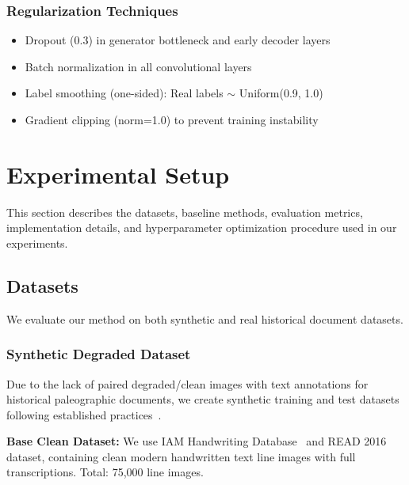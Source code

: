 \documentclass[journal]{IEEEtran}
\begin{document}
\subsubsection{Regularization Techniques}

\begin{itemize}
    \item Dropout (0.3) in generator bottleneck and early decoder layers
    \item Batch normalization in all convolutional layers
    \item Label smoothing (one-sided): Real labels $\sim$ Uniform(0.9, 1.0)
    \item Gradient clipping (norm=1.0) to prevent training instability
\end{itemize}

\section{Experimental Setup}

This section describes the datasets, baseline methods, evaluation metrics, implementation details, and hyperparameter optimization procedure used in our experiments.

\subsection{Datasets}

We evaluate our method on both synthetic and real historical document datasets.

\subsubsection{Synthetic Degraded Dataset}

Due to the lack of paired degraded/clean images with text annotations for historical paleographic documents, we create synthetic training and test datasets following established practices~\cite{souibgui2021enhance,zhao2019document}.

\textbf{Base Clean Dataset:} We use IAM Handwriting Database~\cite{marti2002iam} and READ 2016 dataset, containing clean modern handwritten text line images with full transcriptions. Total: 75,000 line images.
\end{document}
